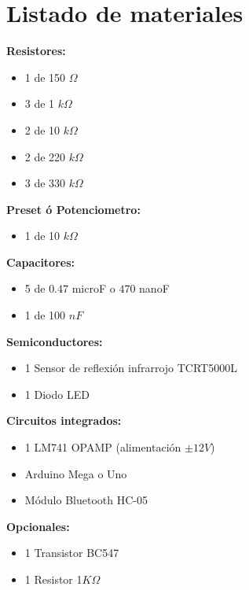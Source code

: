\documentclass[12pt]{article}
\begin{document}
    
    \section{Listado de materiales}
        
        \begin{multicols}{2}
        
            \textbf{Resistores:}
            \begin{itemize}
                \item 1 de 150 $\Omega$
                \item 3 de 1 $k\Omega$
                \item 2 de 10 $k\Omega$
                \item 2 de 220 $k\Omega$
                \item 3 de 330 $k\Omega$
            \end{itemize}
            
            \textbf{Preset ó Potenciometro:}
            \begin{itemize}
                \item 1 de 10 $k\Omega$
            \end{itemize}
            
            \textbf{Capacitores:}
            \begin{itemize}
                \item 5 de $0.47$ microF o $470$ nanoF
                \item 1 de 100 $nF$
            \end{itemize}

      \columnbreak
    
          \textbf{Semiconductores:}
            \begin{itemize}
                \item 1 Sensor de reflexión infrarrojo TCRT5000L
                \item 1 Diodo LED
            \end{itemize}

        \textbf{Circuitos integrados:}
            \begin{itemize}
                \item 1 LM741 OPAMP  (alimentación $\pm12V$)
                \item Arduino Mega o Uno
                \item Módulo Bluetooth HC-05
            \end{itemize}   
            
        \textbf{Opcionales:}
            \begin{itemize}
                \item 1 Transistor BC547
                \item 1 Resistor 1$K\Omega$
            \end{itemize}
      
      \end{multicols}
      
\end{document}
